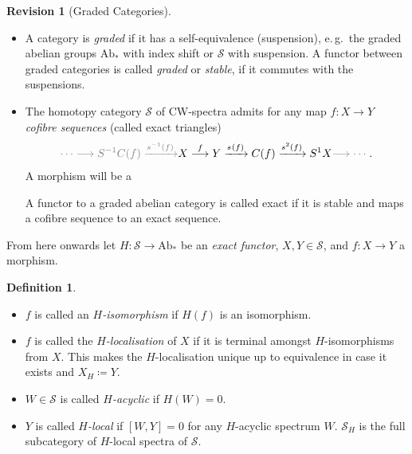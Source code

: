 \documentclass[english]{scrartcl}
\theoremstyle{definition}
\newtheorem*{Def}{Definition}
\newtheorem*{Rev}{Revision}
\theoremstyle{remark}
\newcommand*{\idest}{i.\,e.\ }
\newcommand*{\forexample}{e.\,g.\ }
\newcommand*{\ifftext}{iff}
\newcommand*{\newdef}[1]{\emph{#1}}
\newcommand*{\longto}{\longrightarrow}
\newcommand*{\Cone}[1]{C(#1)}
\newcommand*{\Spectra}{\mathcal{S}} %
\newcommand*{\Sph}{S} %
\newcommand*{\susp}[2][1]{\Sph^{#1}#2}  %
\newcommand*{\conem}[2][]{s^{#1}(#2)}  %
\newcommand*{\graded}[1]{#1_*}  %
\newcommand*{\Abgr}{\graded{\text{Ab}}}  %
\newcommand*{\Hiso}{$H$-isomorphism}  %
\begin{document}
\begin{Rev}[Graded Categories]
  \begin{itemize}
  \item A category is \newdef{graded} if it has a self-equivalence
    (suspension), \forexample the graded abelian groups $\Abgr$ with
    index shift or $\Spectra$ with suspension. A functor between
    graded categories is called \newdef{graded} or \newdef{stable}, if it
    commutes with the suspensions.
  \item The homotopy category $\Spectra$ of CW-spectra admits for any
    map $f\colon X\to Y$ \newdef{cofibre sequences} (called exact triangles)
    \begin{gather*}
      {\color{gray} \dotsb \longto \susp[-1] \Cone f
        \xrightarrow{\conem[-1] f} } X \overset f \longrightarrow Y
      \xrightarrow{\conem f} \Cone f \xrightarrow{\conem[2]f} \susp X
      {\color{gray} \longto \dotsb } \;.
    \end{gather*}
    A morphism will be a
    A functor to a graded abelian category is called exact if it is
    stable and maps a cofibre sequence to an exact sequence.
  \end{itemize}
\end{Rev}

From here onwards let $H\colon\Spectra\to\Abgr$ be an
\newdef{exact functor}, $X,Y\in\Spectra$, and $f\colon X\to Y$ a
morphism.

\begin{Def}
  \begin{itemize}
  \item $f$ is called an \newdef{\Hiso{}} if $H(f)$ is an isomorphism.
  \item $f$ is called the \newdef{$H$-localisation} of $X$ if it is terminal
    amongst \Hiso s from $X$. This makes
    the $H$-localisation unique up to equivalence in case it exists
    and $X_H\coloneqq Y$.
  \item $W\in\Spectra$ is called \newdef{$H$-acyclic} if $H(W)=0$.
  \item $Y$ is called \newdef{$H$-local} if $[W, Y]=0$ for any
    $H$-acyclic spectrum $W$.
    $\Spectra_H$ is the full subcategory of $H$-local spectra of $\Spectra$.
  \end{itemize}
\end{Def}
\end{document}
